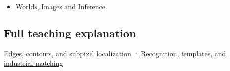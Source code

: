 \begin{itemize}
\tightlist
\item
  \href{Continuous\%20Notes/University\%20-\%20Worlds,\%20Images\%20and\%20Inference\%20-\%20Graphics,\%20Vision\%20and\%20Photography}{Worlds, Images and Inference}
\end{itemize}

\subsection{Full teaching explanation}\label{appendix-a5b0383b3b3e-full-teaching-explanation}

\hyperref[04-visual-computing-ii-ch030-edges-contours-and-subpixel-localization]{Edges, contours, and subpixel localization} · \hyperref[04-visual-computing-ii-ch030-recognition-templates-and-industrial-matching]{Recognition, templates, and industrial matching}
